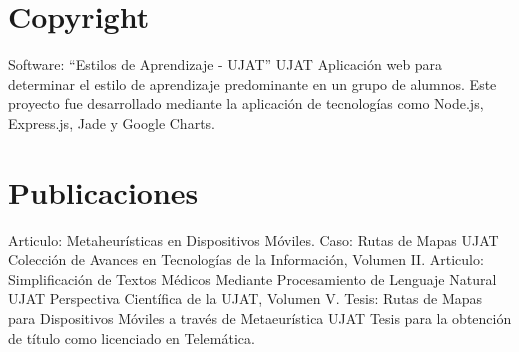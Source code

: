 \documentclass[]{friggeri-cv}
\begin{document}
\section{Copyright}
\begin{entrylist}
          {Software: “Estilos de Aprendizaje - UJAT”}
          {UJAT}
          {Aplicación web para determinar el estilo de aprendizaje predominante en un grupo de alumnos. Este proyecto fue desarrollado mediante la aplicación de tecnologías como Node.js, Express.js, Jade y Google Charts.}
\end{entrylist}
\section{Publicaciones}
\begin{entrylist}
          {Articulo: Metaheurísticas en Dispositivos Móviles. Caso: Rutas de Mapas}
          {UJAT}
          {Colección de Avances en Tecnologías de la Información, Volumen II. }
          {Articulo: Simplificación de Textos Médicos Mediante Procesamiento de Lenguaje Natural}
          {UJAT}
          {Perspectiva Científica de la UJAT, Volumen V.}
          {Tesis: Rutas de Mapas para Dispositivos Móviles a través de Metaeurística}
          {UJAT}
          {Tesis para la obtención de título como licenciado en Telemática.}    
\end{entrylist}
\end{document}

